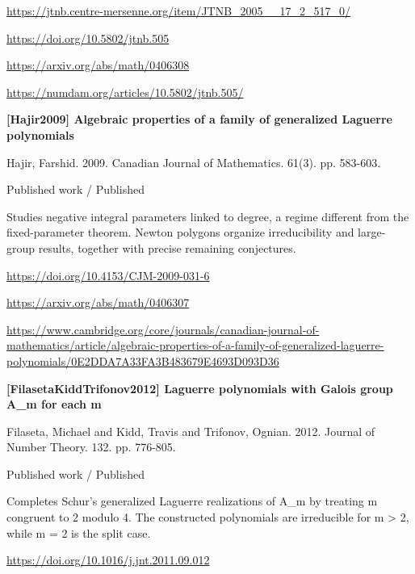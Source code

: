 \documentclass[11pt,a4paper,oneside,openany]{book}
\begin{document}
{\footnotesize\url{https://jtnb.centre-mersenne.org/item/JTNB_2005__17_2_517_0/}}\par
{\footnotesize\url{https://doi.org/10.5802/jtnb.505}}\par
{\footnotesize\url{https://arxiv.org/abs/math/0406308}}\par
{\footnotesize\url{https://numdam.org/articles/10.5802/jtnb.505/}}\par
\vspace{9pt}
\hypertarget{ref:Hajir2009}{}
{\sffamily\bfseries\color{atlasgreen}[Hajir2009] Algebraic properties of a family of generalized Laguerre polynomials}\par
\color{black} Hajir, Farshid. 2009. Canadian Journal of Mathematics. 61(3). pp. 583-603.\par
{\small\sffamily\color{atlasgold}Published work / Published}\par
\color{black} Studies negative integral parameters linked to degree, a regime different from the fixed-parameter theorem. Newton polygons organize irreducibility and large-group results, together with precise remaining conjectures.\par
{\footnotesize\url{https://doi.org/10.4153/CJM-2009-031-6}}\par
{\footnotesize\url{https://arxiv.org/abs/math/0406307}}\par
{\footnotesize\url{https://www.cambridge.org/core/journals/canadian-journal-of-mathematics/article/algebraic-properties-of-a-family-of-generalized-laguerre-polynomials/0E2DDA7A33FA3B483679E4693D093D36}}\par
\vspace{9pt}
\hypertarget{ref:FilasetaKiddTrifonov2012}{}
{\sffamily\bfseries\color{atlasgreen}[FilasetaKiddTrifonov2012] Laguerre polynomials with Galois group A\_\allowbreak{}m for each m}\par
\color{black} Filaseta, Michael and Kidd, Travis and Trifonov, Ognian. 2012. Journal of Number Theory. 132. pp. 776-805.\par
{\small\sffamily\color{atlasgold}Published work / Published}\par
\color{black} Completes Schur's generalized Laguerre realizations of A\_\allowbreak{}m by treating m congruent to 2 modulo 4. The constructed polynomials are irreducible for m > 2, while m = 2 is the split case.\par
{\footnotesize\url{https://doi.org/10.1016/j.jnt.2011.09.012}}\par
\end{document}
